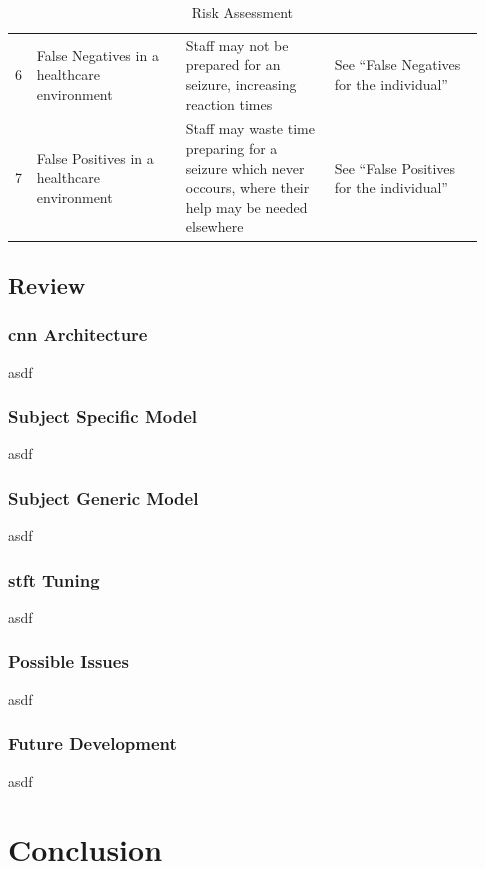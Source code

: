\documentclass[12pt]{article}
\begin{document}
\begin{table}[H]
\begin{tabular}{p{0.03\linewidth}p{0.3\linewidth}p{0.3\linewidth}p{0.3\linewidth}}
6 & False Negatives in a healthcare environment & Staff may not be prepared for an seizure, increasing reaction times & See ``False Negatives for the individual''\\
7 & False Positives in a healthcare environment & Staff may waste time preparing for a seizure which never occours, where their help may be needed elsewhere & See ``False Positives for the individual'' 
\end{tabular}
\caption{Risk Assessment}
\label{tab:risk-assessment}
\end{table}



\subsection{Review}


\subsubsection{\acrfull{cnn} Architecture}

asdf

\subsubsection{Subject Specific Model}

asdf

\subsubsection{Subject Generic Model}

asdf

\subsubsection{\acrfull{stft} Tuning}

asdf


\subsubsection{Possible Issues}

asdf


\subsubsection{Future Development}

asdf

\section{Conclusion}
\end{document}
